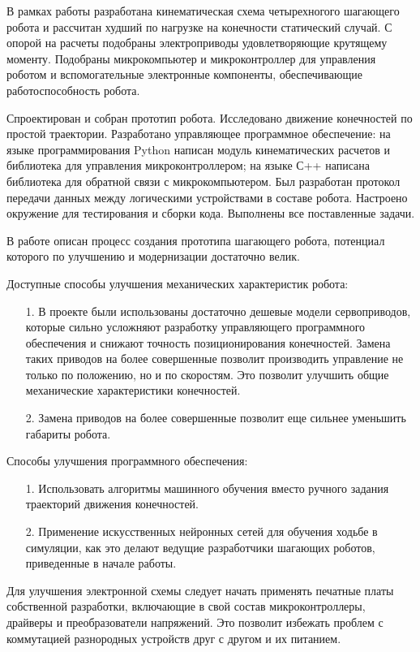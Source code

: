 
В рамках работы разработана кинематическая схема четырехногого шагающего робота и рассчитан худший по нагрузке на конечности статический случай. С опорой на расчеты подобраны электроприводы удовлетворяющие крутящему моменту. Подобраны микрокомпьютер и микроконтроллер для управления роботом и вспомогательные электронные компоненты, обеспечивающие работоспособность робота. 

Спроектирован и собран прототип робота. Исследовано движение конечностей по простой траектории. Разработано управляющее программное обеспечение: на языке программирования Python написан модуль кинематических расчетов и библиотека для управления микроконтроллером; на языке С++ написана библиотека для обратной связи с микрокомпьютером. Был разработан протокол передачи данных между логическими устройствами в составе робота. Настроено окружение для тестирования и сборки кода. Выполнены все поставленные задачи.

В работе описан процесс создания прототипа шагающего робота, потенциал которого по улучшению и модернизации достаточно велик.

Доступные способы улучшения механических характеристик робота:
\begin{itemize}
    \item[1.] В проекте были использованы достаточно дешевые модели сервоприводов, которые сильно усложняют разработку управляющего программного обеспечения и снижают точность позиционирования конечностей. Замена таких приводов на более совершенные позволит производить управление не только по положению, но и по скоростям. Это позволит улучшить общие механические характеристики конечностей.
    \item[2.] Замена приводов на более совершенные позволит еще сильнее уменьшить габариты робота. 
\end{itemize}

Способы улучшения программного обеспечения:
\begin{itemize}
    \item[1.] Использовать алгоритмы машинного обучения вместо ручного задания траекторий движения конечностей.
    \item[2.] Применение искусственных нейронных сетей для обучения ходьбе в симуляции, как это делают ведущие разработчики шагающих роботов, приведенные в начале работы. 
\end{itemize}

Для улучшения электронной схемы следует начать применять печатные платы собственной разработки, включающие в свой состав микроконтроллеры, драйверы и преобразователи напряжений. Это позволит избежать проблем с коммутацией разнородных устройств друг с другом и их питанием.